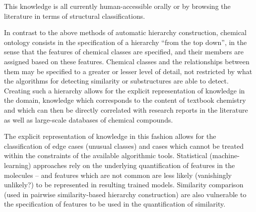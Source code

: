 \documentclass[10pt]{bmc_article}
\newenvironment{bmcformat}{\baselineskip20pt\sloppy\setboolean{publ}{false}}{\baselineskip20pt\sloppy}
\begin{document}
\begin{bmcformat}

This knowledge is all currently human-accessible orally or by browsing the literature in terms of structural classifications.


In contrast to the above methods of automatic hierarchy construction, chemical ontology consists in the specification of a hierarchy ``from the top down'', in the sense that the features of chemical classes are specified, and their members are assigned based on these features.  Chemical classes and the relationships between them may be specified to a greater or lesser level of detail, not restricted by what the algorithms for detecting similarity or substructures are able to detect. Creating such a hierarchy allows for the explicit representation of knowledge in the domain, knowledge which corresponds to the content of textbook chemistry and which can then be directly correlated with research reports in the literature as well as large-scale databases of chemical compounds. %

The explicit representation of knowledge in this fashion allows for the classification of edge cases (unusual classes)
 and cases which cannot be treated within the constraints of the available algorithmic tools. %
 Statistical (machine-learning) approaches rely on the underlying quantification of features in the molecules -- and features which are not common are less likely (vanishingly unlikely?) to be represented in resulting trained models. Similarity comparison (used in pairwise similarity-based hierarchy construction) are also vulnerable to the specification of features to be used in the quantification of similarity. 
 

\end{bmcformat}
\end{document}
